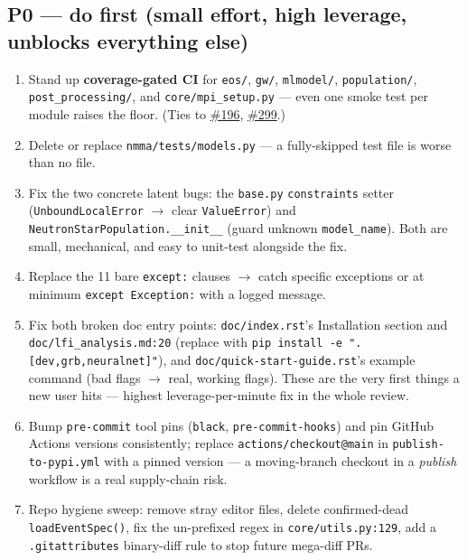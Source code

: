 \documentclass[10pt]{article}
\newcommand{\code}[1]{\texttt{#1}}
\begin{document}
\subsection*{P0 --- do first (small effort, high leverage, unblocks everything else)}
\begin{enumerate}
\item Stand up \textbf{coverage-gated CI} for \code{eos/}, \code{gw/},
  \code{mlmodel/}, \code{population/}, \code{post\_processing/}, and
  \code{core/mpi\_setup.py} --- even one smoke test per module raises the floor.
  (Ties to \href{https://github.com/nuclear-multimessenger-astronomy/nmma/issues/196}{\#196}, \href{https://github.com/nuclear-multimessenger-astronomy/nmma/issues/299}{\#299}.)
\item Delete or replace \code{nmma/tests/models.py} --- a fully-skipped test file
  is worse than no file.
\item Fix the two concrete latent bugs: the \code{base.py} \code{constraints}
  setter (\code{UnboundLocalError} $\to$ clear \code{ValueError}) and
  \code{NeutronStarPopulation.\_\_init\_\_} (guard unknown \code{model\_name}).
  Both are small, mechanical, and easy to unit-test alongside the fix.
\item Replace the 11 bare \code{except:} clauses $\to$ catch specific exceptions or
  at minimum \code{except Exception:} with a logged message.
\item Fix both broken doc entry points: \code{doc/index.rst}'s Installation
  section and \code{doc/lfi\_analysis.md:20} (replace with
  \code{pip install -e ".[dev,grb,neuralnet]"}), and
  \code{doc/quick-start-guide.rst}'s example command (bad flags $\to$ real,
  working flags). These are the very first things a new user hits --- highest
  leverage-per-minute fix in the whole review.
\item Bump \code{pre-commit} tool pins (\code{black}, \code{pre-commit-hooks}) and
  pin GitHub Actions versions consistently; replace \code{actions/checkout@main}
  in \code{publish-to-pypi.yml} with a pinned version --- a moving-branch checkout
  in a \emph{publish} workflow is a real supply-chain risk.
\item Repo hygiene sweep: remove stray editor files, delete confirmed-dead
  \code{loadEventSpec()}, fix the un-prefixed regex in \code{core/utils.py:129},
  add a \code{.gitattributes} binary-diff rule to stop future mega-diff PRs.
\end{enumerate}
\end{document}

